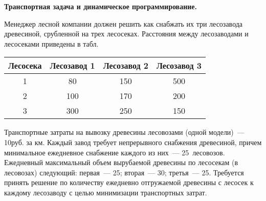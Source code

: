 \documentclass[a5paper,11pt]{extarticle}
\begin{document}
\begin{enumerate}
  {\item[]
          \bfseries Транспортная задача и динамическое программирование.
          \par\vspace{1mm}
  }


\item  Менеджер лесной компании должен решить как снабжать их три лесозавода древесиной, срубленной на трех лесосеках. 
Расстояния между лесозаводами и лесосеками приведены в табл. 
{\par\centering
	\begin{tabular}{c|ccc}
		Лесосека & Лесозавод 1&  Лесозавод 2 &  Лесозавод 3\\
		\hline
		1& 80& 150& 500\\
		2& 100& 170& 200\\
		3&  300&  250&  150\\
	\end{tabular}\par
}
Транспортные затраты на вывозку древесины лесовозами (одной модели)~--- 10\;руб. за км. 
Каждый завод требует непрерывного снабжения древесиной, причем минимальное ежедневное снабжение каждого из них~--- 25~лесовозов. 
Ежедневный максимальный объем вырубаемой древесины по лесосекам (в лесовозах) следующий: 
первая~--- 25; вторая~--- 30; третья~--- 25.
Требуется принять решение по количеству ежедневно отгружаемой древесины с лесосек к каждому лесозаводу с целью минимизации транспортных затрат.


\end{enumerate}
\end{document}
